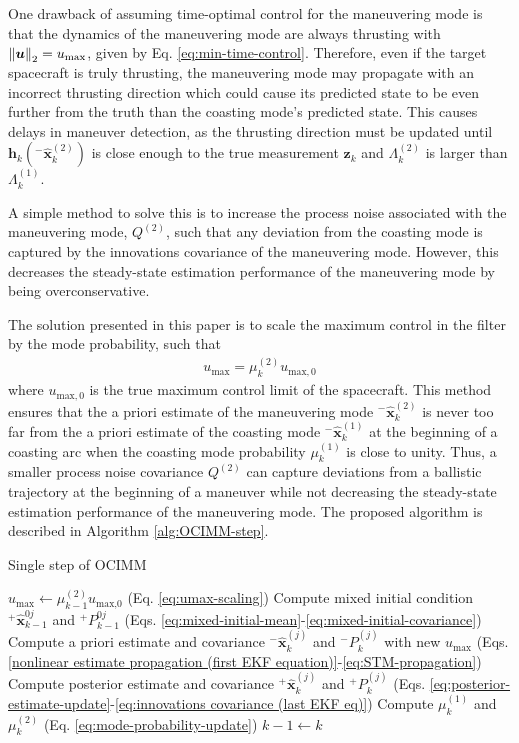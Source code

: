 \documentclass[letterpaper, preprint, paper,11pt]{AAS}	%
\begin{document}
One drawback of assuming time-optimal control for the maneuvering mode is that the dynamics of the maneuvering mode are always thrusting with $\norm{\bm{u}}_2 = u_\text{max}$, given by Eq. \ref{eq:min-time-control}. Therefore, even if the target spacecraft is truly thrusting, the maneuvering mode may propagate with an incorrect thrusting direction which could cause its predicted state to be even further from the truth than the coasting mode's predicted state. This causes delays in maneuver detection, as the thrusting direction must be updated until $\bm{h}_k(^-\hat{\bm{x}}_k^{(2)})$ is close enough to the true measurement $\bm{z}_k$ and $\Lambda_k^{(2)}$ is larger than $\Lambda_k^{(1)}$. 

A simple method to solve this is to increase the process noise associated with the maneuvering mode, $Q^{(2)}$, such that any deviation from the coasting mode is captured by the innovations covariance of the maneuvering mode. However, this decreases the steady-state estimation performance of the maneuvering mode by being overconservative. 

The solution presented in this paper is to scale the maximum control in the filter by the mode probability, such that
\begin{align}
    u_\text{max} = \mu_k^{(2)} u_{\text{max}, 0} \label{eq:umax-scaling}
\end{align}
where $u_{\text{max}, 0}$ is the true maximum control limit of the spacecraft. This method ensures that the a priori estimate of the maneuvering mode $^-\hat{\bm{x}}_k^{(2)}$ is never too far from the a priori estimate of the coasting mode $^-\hat{\bm{x}}_k^{(1)}$ at the beginning of a coasting arc when the coasting mode probability $\mu_k^{(1)}$ is close to unity. Thus, a smaller process noise covariance $Q^{(2)}$ can capture deviations from a ballistic trajectory at the beginning of a maneuver while not decreasing the steady-state estimation performance of the maneuvering mode. The proposed algorithm is described in Algorithm \ref{alg:OCIMM-step}.

\begin{algorithm}[H]
    \caption{Single step of OCIMM}
    \begin{algorithmic}
        \State $u_\text{max} \gets \mu_{k-1}^{(2)} u_\text{max,0}$ (Eq. \ref{eq:umax-scaling})
            \State Compute mixed initial condition ${}^+ \hat{\bm{x}}_{k-1}^{0j}$ and ${}^+P_{k-1}^{0j}$ (Eqs. \ref{eq:mixed-initial-mean}-\ref{eq:mixed-initial-covariance})
            \State Compute a priori estimate and covariance ${}^- \hat{\bm{x}}_k^{(j)}$ and ${}^-P_{k}^{(j)}$ with new $u_\text{max}$ (Eqs. \ref{nonlinear estimate propagation (first EKF equation)}-\ref{eq:STM-propagation})
            \State Compute posterior estimate and covariance ${}^+ \hat{\bm{x}}_k^{(j)}$ and ${}^+P_{k}^{(j)}$ (Eqs. \ref{eq:posterior-estimate-update}-\ref{eq:innovations covariance (last EKF eq)})
        \EndFor
        \State Compute $\mu_k^{(1)}$ and $\mu_k^{(2)}$ (Eq. \ref{eq:mode-probability-update})
        \State $k-1 \gets k$ 
    \end{algorithmic}
    \label{alg:OCIMM-step}
\end{algorithm}
\end{document}
